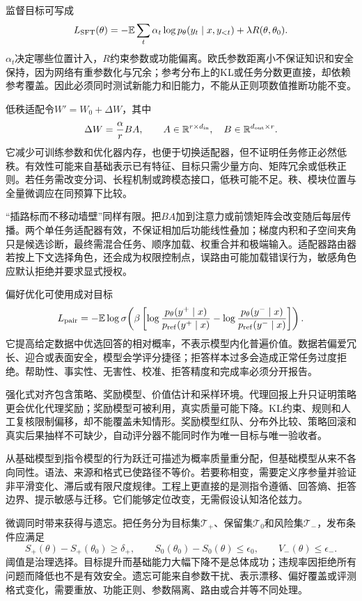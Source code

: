 监督目标可写成
\[
L_{\rm SFT}(\theta)=-\mathbb E\sum_t\alpha_t
\log p_\theta(y_t\mid x,y_{<t})+\lambda R(\theta,\theta_0).
\]
$\alpha_t$决定哪些位置计入，$R$约束参数或功能偏离。欧氏参数距离小不保证知识和安全保持，因为网络有重参数化与冗余；参考分布上的KL或任务分数更直接，却依赖参考覆盖。因此必须同时测试新能力和旧能力，不能从正则项数值推断功能不变。

低秩适配令$W'=W_0+\Delta W$，其中
\[
\Delta W=\frac{\alpha}{r}BA,\qquad
A\in\mathbb R^{r\times d_{\rm in}},\quad
B\in\mathbb R^{d_{\rm out}\times r}.
\]
它减少可训练参数和优化器内存，也便于切换适配器，但不证明任务修正必然低秩。有效性可能来自基础表示已有特征、目标只需少量方向、矩阵冗余或低秩正则。若任务需改变分词、长程机制或跨模态接口，低秩可能不足。秩、模块位置与全量微调应在同预算下比较。

“插路标而不移动墙壁”同样有限。把$BA$加到注意力或前馈矩阵会改变随后每层传播。两个单任务适配器有效，不保证相加后功能线性叠加；梯度内积和子空间夹角只是候选诊断，最终需混合任务、顺序加载、权重合并和极端输入。适配器路由器若按上下文选择角色，还会成为权限控制点，误路由可能加载错误行为，敏感角色应默认拒绝并要求显式授权。

偏好优化可使用成对目标
\[
L_{\rm pair}=-\mathbb E\log\sigma\!\left(\beta\left[
\log\frac{p_\theta(y^+\mid x)}{p_{\rm ref}(y^+\mid x)}-
\log\frac{p_\theta(y^-\mid x)}{p_{\rm ref}(y^-\mid x)}\right]\right).
\]
它提高给定数据中优选回答的相对概率，不表示模型内化普遍价值。数据若偏爱冗长、迎合或表面安全，模型会学评分捷径；拒答样本过多会造成正常任务过度拒绝。帮助性、事实性、无害性、校准、拒答精度和完成率必须分开报告。

强化式对齐包含策略、奖励模型、价值估计和采样环境。代理回报上升只证明策略更会优化代理奖励；奖励模型可被利用，真实质量可能下降。KL约束、规则和人工复核限制偏移，却不能覆盖未知情形。奖励模型红队、分布外比较、策略回滚和真实后果抽样不可缺少，自动评分器不能同时作为唯一目标与唯一验收者。

从基础模型到指令模型的行为跃迁可描述为概率质量重分配，但基础模型从来不各向同性。语法、来源和格式已使路径不等价。若要称相变，需要定义序参量并验证非平滑变化、滞后或有限尺度规律。工程上更直接的是测指令遵循、回答熵、拒答边界、提示敏感与迁移。它们能够定位改变，无需假设认知洛伦兹力。

微调同时带来获得与遗忘。把任务分为目标集$\mathcal T_+$、保留集$\mathcal T_0$和风险集$\mathcal T_-$，发布条件应满足
\[
S_+(\theta)-S_+(\theta_0)\geq\delta_+,\qquad
S_0(\theta_0)-S_0(\theta)\leq\epsilon_0,\qquad
V_-(\theta)\leq\epsilon_-.
\]
阈值是治理选择。目标提升而基础能力大幅下降不是总体成功；违规率因拒绝所有问题而降低也不是有效安全。遗忘可能来自参数干扰、表示漂移、偏好覆盖或评测格式变化，需要重放、功能正则、参数隔离、路由或合并等不同处理。

